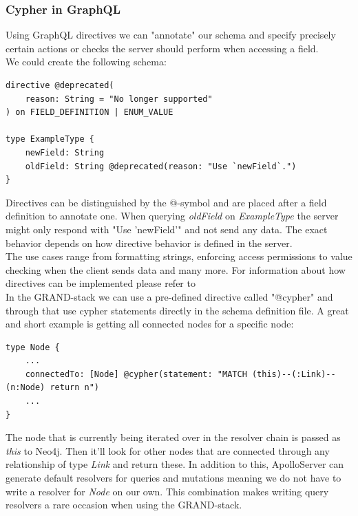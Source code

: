 \subsubsection{Cypher in GraphQL}
Using GraphQL directives we can "annotate" our schema and specify precisely certain actions or checks the server should perform when accessing a field. \\
We could create the following schema: \cite{GraphQlDir}

\lstset{language=GraphQL}
\begin{lstlisting}[caption={Example Directive Declaration}]
directive @deprecated( 
	reason: String = "No longer supported" 
) on FIELD_DEFINITION | ENUM_VALUE 

type ExampleType { 
	newField: String 
	oldField: String @deprecated(reason: "Use `newField`.")
}
\end{lstlisting}

Directives can be distinguished by the @-symbol and are placed after a field definition to annotate one. When querying \emph{oldField} on \emph{ExampleType} the server might only respond with "Use 'newField'" and not send any data. The exact behavior depends on how directive behavior is defined in the server. \\
The use cases range from formatting strings, enforcing access permissions to value checking when the client sends data and many more. For information about how directives can be implemented please refer to \cite{GraphQlDir}
\\
In the GRAND-stack we can use a pre-defined directive called "@cypher" and through that use cypher statements directly in the schema definition file. A great and short example is getting all connected nodes for a specific node:

\begin{lstlisting}[caption={Cypher in GraphQL}]
type Node { 
	... 
	connectedTo: [Node] @cypher(statement: "MATCH (this)--(:Link)--(n:Node) return n") 
	...
}
\end{lstlisting}

The node that is currently being iterated over in the resolver chain is passed as \emph{this} to Neo4j. Then it'll look for other nodes that are connected through any relationship of type \emph{Link} and return these. In addition to this, ApolloServer can generate default resolvers for queries and mutations meaning we do not have to write a resolver for \emph{Node} on our own. This combination makes writing query resolvers a rare occasion when using the GRAND-stack. \\

